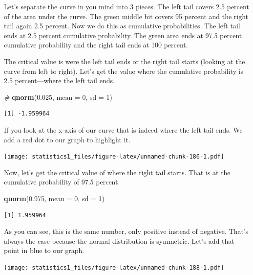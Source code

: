 \documentclass[]{article}
\newenvironment{Shaded}{\begin{snugshade}}{\end{snugshade}}
\newcommand{\KeywordTok}[1]{\textcolor[rgb]{0.13,0.29,0.53}{\textbf{#1}}}
\newcommand{\DataTypeTok}[1]{\textcolor[rgb]{0.13,0.29,0.53}{#1}}
\newcommand{\DecValTok}[1]{\textcolor[rgb]{0.00,0.00,0.81}{#1}}
\newcommand{\FloatTok}[1]{\textcolor[rgb]{0.00,0.00,0.81}{#1}}
\newcommand{\CommentTok}[1]{\textcolor[rgb]{0.56,0.35,0.01}{\textit{#1}}}
\newcommand{\NormalTok}[1]{#1}
\theoremstyle{definition}
\theoremstyle{definition}
\theoremstyle{definition}
\theoremstyle{remark}
\begin{document}
Let's separate the curve in you mind into 3 pieces. The left tail covers
2.5 percent of the area under the curve. The green middle bit covers 95
percent and the right tail again 2.5 percent. Now we do this as
cumulative probabilities. The left tail ends at 2.5 percent cumulative
probability. The green area ends at 97.5 percent cumulative probability
and the right tail ends at 100 percent.

The critical value is were the left tail ends or the right tail starts
(looking at the curve from left to right). Let's get the value where the
cumulative probability is 2.5 percent---where the left tail ends.

\begin{Shaded}
\begin{Highlighting}[]
\CommentTok{#}
\KeywordTok{qnorm}\NormalTok{(}\FloatTok{0.025}\NormalTok{, }\DataTypeTok{mean =} \DecValTok{0}\NormalTok{, }\DataTypeTok{sd =} \DecValTok{1}\NormalTok{)}
\end{Highlighting}
\end{Shaded}

\begin{verbatim}
[1] -1.959964
\end{verbatim}

If you look at the x-axis of our curve that is indeed where the left
tail ends. We add a red dot to our graph to highlight it.

\texttt{[image: statistics1\_files/figure-latex/unnamed-chunk-186-1.pdf]}

Now, let's get the critical value of where the right tail starts. That
is at the cumulative probability of 97.5 percent.

\begin{Shaded}
\begin{Highlighting}[]
\KeywordTok{qnorm}\NormalTok{(}\FloatTok{0.975}\NormalTok{, }\DataTypeTok{mean =} \DecValTok{0}\NormalTok{, }\DataTypeTok{sd =} \DecValTok{1}\NormalTok{)}
\end{Highlighting}
\end{Shaded}

\begin{verbatim}
[1] 1.959964
\end{verbatim}

As you can see, this is the same number, only positive instead of
negative. That's always the case because the normal distribution is
symmetric. Let's add that point in blue to our graph.

\texttt{[image: statistics1\_files/figure-latex/unnamed-chunk-188-1.pdf]}
\end{document}

